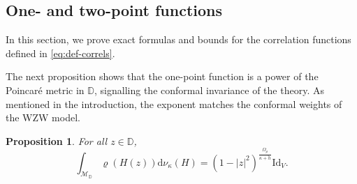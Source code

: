 \documentclass[12pt,a4paper]{amsart}
\numberwithin{equation}{section}
\newcounter{exa}
\newtheorem{proposition}[theorem]{Proposition}
\theoremstyle{remark}
\theoremstyle{definition}
\newcommand{\D}{\mathbb D}
\renewcommand{\d}{\mathrm d}
\newcommand{\cM}{\mathcal M}
\begin{document}
    \subsection{One- and two-point functions}\label{subsec:correlations}
In this section, we prove exact formulas and bounds for the correlation functions defined in \eqref{eq:def-correls}.

The next proposition shows that the one-point function is a power of the Poincar\'e metric in $\D$, signalling the conformal invariance of the theory. As mentioned in the introduction, the exponent matches the conformal weights of the WZW model.

\begin{proposition}\label{prop:one-point}
    For all $z\in\D$,
    \[\int_{\cM_\D}\varrho(H(z))\d\nu_\kappa(H)=(1-|z|^2)^\frac{\Omega_\rho}{\kappa+\check h}\mathrm{Id}_V.\]
\end{proposition}
\end{document}
